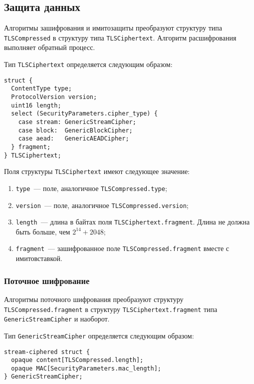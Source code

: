 \subsection{Защита данных}\label{RECORD.3.3}
    
Алгоритмы зашифрования и имитозащиты преобразуют структуру типа 
\lstinline{TLSCompressed} в структуру типа \lstinline{TLSCiphertext}. 
Алгоритм расшифрования выполняет обратный процесс. 

Тип \lstinline{TLSCiphertext} определяется следующим образом:
\begin{lstlisting}
struct {
  ContentType type;
  ProtocolVersion version;
  uint16 length;
  select (SecurityParameters.cipher_type) {
    case stream: GenericStreamCipher;
    case block:  GenericBlockCipher;
    case aead:   GenericAEADCipher;
  } fragment;
} TLSCiphertext;
\end{lstlisting}
 
Поля структуры \lstinline{TLSCiphertext} имеют следующее значение:
\begin{enumerate} 
\item[--]
\lstinline{type}~--- поле, аналогичное \lstinline{TLSCompressed.type};

\item[--]
\lstinline{version}~--- поле, аналогичное \lstinline{TLSCompressed.version};

\item[--]
\lstinline{length}~--- длина в байтах поля 
\lstinline{TLSCiphertext.fragment}. Длина не должна быть больше, чем 
$2^{14} + 2048$; 

\item[--]
\lstinline{fragment}~--- зашифрованное поле 
\lstinline{TLSCompressed.fragment} вместе с имитовставкой. 
\end{enumerate}
                
\subsubsection {Поточное шифрование}\label{RECORD.3.3.1}

Алгоритмы поточного шифрования преобразуют структуру 
\lstinline{TLSCompressed.fragment} в структуру 
\lstinline{TLSCiphertext.fragment} типа \lstinline{GenericStreamCipher} и 
наоборот.   

Тип \lstinline{GenericStreamCipher} определяется следующим образом:
\begin{lstlisting}
stream-ciphered struct {
  opaque content[TLSCompressed.length];
  opaque MAC[SecurityParameters.mac_length];
} GenericStreamCipher;
\end{lstlisting}

